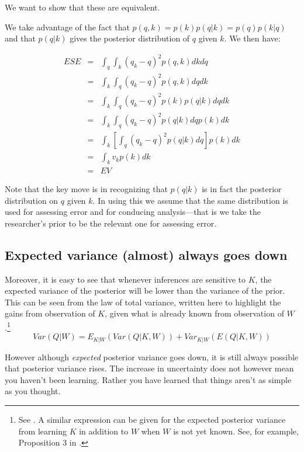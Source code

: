 \documentclass[12pt,]{book}
\let\rmarkdownfootnote\footnote%
\def\footnote{\protect\rmarkdownfootnote}
\begin{document}
We want to show that these are equivalent.

We take advantage of the fact that \(p(q,k) = p(k)p(q|k) = p(q)p(k|q)\) and that \(p(q|k)\) gives the posterior distribution of \(q\) given \(k\). We then have:

\[
\begin{eqnarray}
ESE &=& \int_q\int_k \left({q}_k-q\right)^2p(q,k)dkdq \\
    &=& \int_k\int_q \left({q}_k-q\right)^2p(q,k)dq dk \\
    &=& \int_k\int_q \left({q}_k-q\right)^2p(k)p(q|k)dq dk \\
    &=& \int_k\int_q \left({q}_k-q\right)^2p(q|k)dq p(k)dk \\
    &=& \int_k\left[\int_q \left({q}_k-q\right)^2p(q|k)dq\right]p(k)dk \\
    &=& \int_k v_k p(k)dk \\
    & = & EV
\end{eqnarray}
\]

Note that the key move is in recognizing that \(p(q |k)\) is in fact the posterior distribution on \(q\) given \(k\). In using this we assume that the same distribution is used for assessing error and for conducing analysis---that is we take the researcher's prior to be the relevant one for assessing error.

\hypertarget{expected-variance-almost-always-goes-down}{%
\subsection{Expected variance (almost) always goes down}\label{expected-variance-almost-always-goes-down}}

Moreover, it is easy to see that whenever inferences are sensitive to \(K\), the expected variance of the posterior will be lower than the variance of the prior. This can be seen from the law of total variance, written here to highlight the gains from observation of \(K\), given what is already known from observation of \(W\).\footnote{See \citet{raiffa1961applied}. A similar expression can be given for the expected posterior variance from learning \(K\) in addition to \(W\) when \(W\) is not yet known. See, for example, Proposition 3 in \citet{geweke2014analysis}.}\\
\[Var(Q|W) = E_{K|W}(Var(Q|K,W)) +Var_{K|W}(E(Q|K,W))\]

However although \emph{expected} posterior variance goes down, it is still always possible that posterior variance rises. The increase in uncertainty does not however mean you haven't been learning. Rather you have learned that things aren't as simple as you thought.
\end{document}
